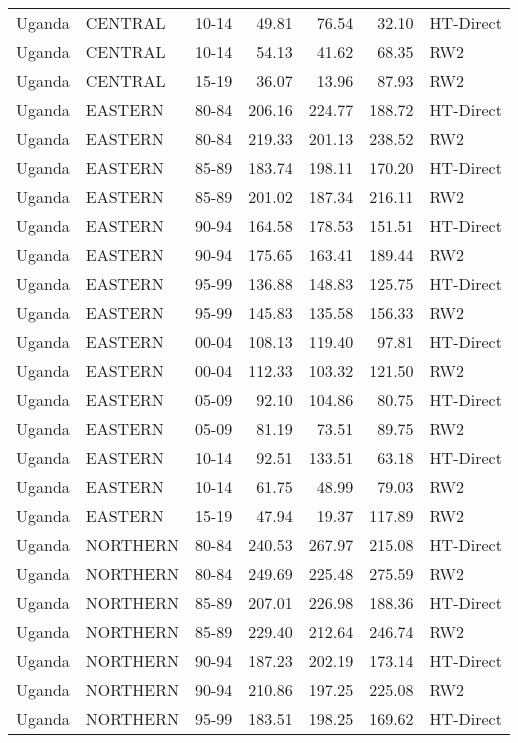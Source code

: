 \begin{longtable}{lllrrrl}
  Uganda & CENTRAL & 10-14 & 49.81 & 76.54 & 32.10 & HT-Direct \\ 
  Uganda & CENTRAL & 10-14 & 54.13 & 41.62 & 68.35 & RW2 \\ 
  Uganda & CENTRAL & 15-19 & 36.07 & 13.96 & 87.93 & RW2 \\ 
  Uganda & EASTERN & 80-84 & 206.16 & 224.77 & 188.72 & HT-Direct \\ 
  Uganda & EASTERN & 80-84 & 219.33 & 201.13 & 238.52 & RW2 \\ 
  Uganda & EASTERN & 85-89 & 183.74 & 198.11 & 170.20 & HT-Direct \\ 
  Uganda & EASTERN & 85-89 & 201.02 & 187.34 & 216.11 & RW2 \\ 
  Uganda & EASTERN & 90-94 & 164.58 & 178.53 & 151.51 & HT-Direct \\ 
  Uganda & EASTERN & 90-94 & 175.65 & 163.41 & 189.44 & RW2 \\ 
  Uganda & EASTERN & 95-99 & 136.88 & 148.83 & 125.75 & HT-Direct \\ 
  Uganda & EASTERN & 95-99 & 145.83 & 135.58 & 156.33 & RW2 \\ 
  Uganda & EASTERN & 00-04 & 108.13 & 119.40 & 97.81 & HT-Direct \\ 
  Uganda & EASTERN & 00-04 & 112.33 & 103.32 & 121.50 & RW2 \\ 
  Uganda & EASTERN & 05-09 & 92.10 & 104.86 & 80.75 & HT-Direct \\ 
  Uganda & EASTERN & 05-09 & 81.19 & 73.51 & 89.75 & RW2 \\ 
  Uganda & EASTERN & 10-14 & 92.51 & 133.51 & 63.18 & HT-Direct \\ 
  Uganda & EASTERN & 10-14 & 61.75 & 48.99 & 79.03 & RW2 \\ 
  Uganda & EASTERN & 15-19 & 47.94 & 19.37 & 117.89 & RW2 \\ 
  Uganda & NORTHERN & 80-84 & 240.53 & 267.97 & 215.08 & HT-Direct \\ 
  Uganda & NORTHERN & 80-84 & 249.69 & 225.48 & 275.59 & RW2 \\ 
  Uganda & NORTHERN & 85-89 & 207.01 & 226.98 & 188.36 & HT-Direct \\ 
  Uganda & NORTHERN & 85-89 & 229.40 & 212.64 & 246.74 & RW2 \\ 
  Uganda & NORTHERN & 90-94 & 187.23 & 202.19 & 173.14 & HT-Direct \\ 
  Uganda & NORTHERN & 90-94 & 210.86 & 197.25 & 225.08 & RW2 \\ 
  Uganda & NORTHERN & 95-99 & 183.51 & 198.25 & 169.62 & HT-Direct \\ 

\end{longtable}
